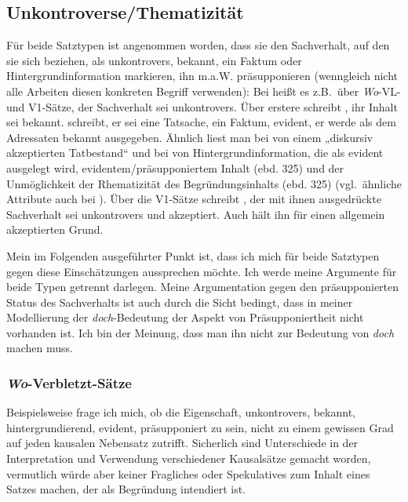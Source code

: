 {\subsection{Unkontroverse/Thematizität}
\label{sec:unkontr}
Für beide Satztypen ist angenommen worden, dass sie den Sachverhalt, auf den sie sich beziehen, als unkontrovers, bekannt, ein Faktum oder Hintergrundinformation markieren,  ihn m.a.W. präsupponieren  (wenngleich nicht alle Arbeiten diesen konkreten Begriff verwenden): Bei \citet[90]{Kwon2005} heißt es z.B.\ über \textit{Wo}-VL- und V1-Sätze, der Sachverhalt sei unkontrovers. Über erstere schreibt \citet[43]{Winkler1992}, ihr Inhalt sei bekannt. \citet[145]{Pasch1999} schreibt, er sei eine Tatsache, ein Faktum, evident, er werde als dem Adressaten bekannt ausgegeben. Ähnlich liest man bei \citet[236]{Eroms2000} von einem „diskursiv akzeptierten Tatbestand“ und bei \citet[315]{Guenthner2002} von Hintergrundinformation, die als evident ausgelegt wird, evidentem/präsupponiertem Inhalt (ebd. 325) und der Unmöglichkeit der Rhematizität des Begründungsinhalts (ebd. 325) (vgl.\ ähnliche Attribute auch bei \citealt[134, 135, 148]{Guenthner2007}). Über die V1-Sätze schreibt \citet[1020]{Altmann1993}, der mit ihnen ausgedrückte Sachverhalt sei unkontrovers und akzeptiert. Auch \citet[171]{Pittner2011} hält ihn für einen allgemein akzeptierten Grund.

Mein im Folgenden ausgeführter Punkt ist, dass ich mich für beide Satztypen gegen diese Einschätzungen aussprechen möchte. Ich werde meine Argumente für beide Typen getrennt darlegen. Meine Argumentation gegen den präsupponierten Status des Sachverhalts ist auch durch die Sicht bedingt, dass in meiner Modellierung der \textit{doch}-Bedeutung der Aspekt von Präsupponiertheit nicht vorhanden ist. Ich bin der Meinung, dass man ihn nicht zur Bedeutung von \textit{doch} machen muss. 

\subsubsection{\textit{Wo}-Verbletzt-Sätze}
Beispielsweise frage ich mich, ob die Eigenschaft, unkontrovers, bekannt, hintergrundierend, evident, präsupponiert zu sein, nicht zu einem gewissen Grad auf jeden kausalen Nebensatz zutrifft. Sicherlich sind Unterschiede in der Interpretation und Verwendung verschiedener Kausalsätze gemacht worden, vermutlich würde aber keiner Fragliches oder Spekulatives zum Inhalt eines Satzes machen, der als Begründung intendiert ist.

}
